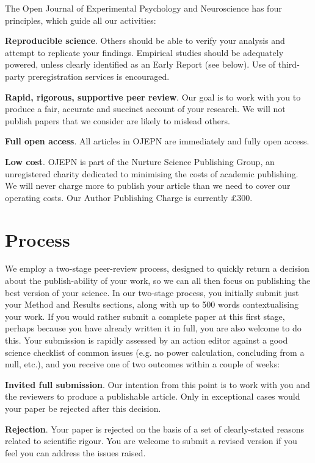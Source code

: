 \documentclass[twocolumn]{article}
\let\tempthree\enumerate
\let\tempfour\endenumerate
\renewenvironment{enumerate}{\tempthree\setlength{\itemsep}{0pt}}{\tempfour}
\begin{document}
The Open Journal of Experimental Psychology and Neuroscience has four principles, which guide all our activities:

\begin{enumerate}

\item \textbf{Reproducible science}. Others should be able to verify your analysis and attempt to replicate your findings. Empirical studies should be adequately powered, unless clearly identified as an Early Report (see below). Use of third-party preregistration services is encouraged.

\item \textbf{Rapid, rigorous, supportive peer review}. Our goal is to work with you to produce a fair, accurate and succinct account of your research. We will not publish papers that we consider are likely to mislead others. 
  
\item \textbf{Full open access}. All articles in OJEPN are immediately and fully open access.

\item \textbf{Low cost}. OJEPN is part of the Nurture Science Publishing Group, an unregistered charity dedicated to minimising the costs of academic publishing. We will never charge more to publish your article than we need to cover our operating costs. Our Author Publishing Charge is currently £300.

\end{enumerate}

  
\section{Process} 

We employ a two-stage peer-review process, designed to quickly return a decision about the publish-ability of your work, so we can all then focus on publishing the best version of your science. In our two-stage process, you initially submit just your Method and Results sections, along with up to 500 words contextualising your work. If you would rather submit a complete paper at this first stage, perhaps because you have already written it in full, you are also welcome to do this. Your submission is rapidly assessed by an action editor against a good science checklist of common issues (e.g. no power calculation, concluding from a null, etc.), and you receive one of two outcomes within a couple of weeks:

\begin{enumerate}
  
\item \textbf{Invited full submission}. Our intention from this point is to work with you and the reviewers to produce a publishable article. Only in exceptional cases would your paper be rejected after this decision.
  
\item \textbf{Rejection}. Your paper is rejected on the basis of a set of clearly-stated reasons related to scientific rigour. You are welcome to submit a revised version if you feel you can address the issues raised.

\end{enumerate}
\end{document}
